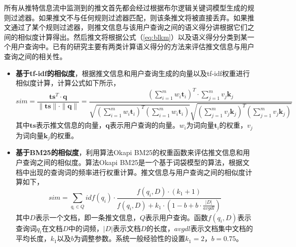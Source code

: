 所有从推特信息流中监测到的推文首先都会经过根据布尔逻辑关键词模型生成的规则过滤器。如果推文不与任何规则过滤器匹配，则该条推文将被直接丢弃。如果推文通过了某个规则过滤器，则推文信息与该用户查询之间的语义得分讲根据它们之间的相似度计算得出。然后推文将根据公式（\ref{eq:blkm}）以及语义得分分类到某一个用户查询中。已有的研究主要有两类计算语义得分的方法来评估推文信息与用户查询之间的相关性。
\begin{itemize}
  \item \textbf{基于tf-idf的相似度}，根据推文信息和用户查询生成的向量以及tf-idf权重进行相似度计算，计算公式如下所示，
  \begin{equation}
  \label{eq:tf-idf}
  sim = \frac{\mathbf{ts}^T \cdot \mathbf{q}}{\|\mathbf{ts}\| \cdot \|\mathbf{q}\|} = \frac{\left(\sum \limits_{i=1}^m {w_i \mathbf{t}_i}\right)^T \cdot \sum \limits_{j=1}^m {v_j \mathbf{k}_j}}{\sqrt{\left(\sum \limits_{i=1}^m {w_i \mathbf{t}_i}\right)^T \left(\sum \limits_{i=1}^m {w_i \mathbf{t}_i}\right)}\sqrt{\left(\sum \limits_{j=1}^m {v_j \mathbf{k}_j}\right)^T \left(\sum \limits_{j=1}^m {v_j \mathbf{k}_j}\right)}}
  \end{equation}
  其中$\mathbf{ts}$表示推文信息的向量，$\mathbf{q}$表示用户查询的向量。$w_i$为词向量$\mathbf{t}_i$的权重，$v_j$为词向量$\mathbf{k}_j$的权重。
  \item \textbf{基于BM25的相似度}，利用算法Okapi BM25的权重函数来评估推文信息和用户查询之间的相似度。算法Okapi BM25是一个基于词袋模型的算法，根据文档中出现的查询词的频率进行权重计算。推文信息与用户查询之间的相似度计算如下，
  \begin{equation}
  \label{eq:bm25}
  sim = \sum \limits_{q_i \in Q} {idf\left(q_i\right) \cdot \frac{ f\left(q_i,D\right) \cdot \left(k_1 + 1\right)}{f\left(q_i,D\right) + k_1 \cdot \left(1-b+b\cdot\frac{|D|}{avgdl}\right)}}
  \end{equation}
  其中$D$表示一个文档，即一条推文信息，$Q$表示用户查询。函数$f\left(q_i,D\right)$表示查询词$q_i$在文档$D$中的词频，$|D|$表示文档$D$的长度，$avgdl$表示文档集中文档的平均长度，$k_1$以及$b$为调整参数。系统一般经验性的设置$k_1=2$，$b=0.75$。
\end{itemize}

